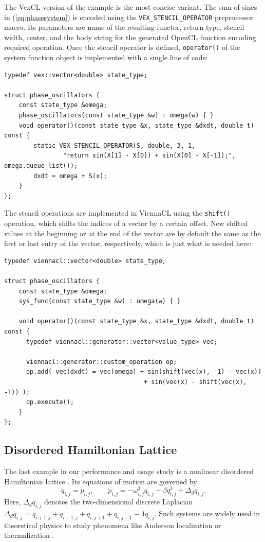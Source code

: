 \documentclass[final]{siamltex}
\newcommand{\code}[1]{\lstinline$#1$}
\newcommand{\eqref}[1]{(\ref{#1})}
\begin{document}
The VexCL version of the example is the most concise variant. The sum of
sines in \eqref{eq:phasesystem} is encoded using the
\code{VEX_STENCIL_OPERATOR} preprocessor macro. Its parameters are name of the
resulting functor, return type, stencil width, center, and the body string for
the generated OpenCL function encoding required operation.  Once the stencil
operator is defined, \code{operator()} of the system function object is
implemented with a single line of code:
\begin{lstlisting}
typedef vex::vector<double> state_type;

struct phase_oscillators {
    const state_type &omega;
    phase_oscillators(const state_type &w) : omega(w) { }
    void operator()(const state_type &x, state_type &dxdt, double t) const {
        static VEX_STENCIL_OPERATOR(S, double, 3, 1,
                "return sin(X[1] - X[0]) + sin(X[0] - X[-1]);", omega.queue_list());
        dxdt = omega + S(x);
    }
};
\end{lstlisting}


The stencil operations are implemented in ViennaCL using the \code{shift()} operation,
which shifts the indices of a vector by a certain offset. 
New shifted values at the beginning or at the end of the vector are by default the same as the first or last entry of the vector, respectively,
which is just what is needed here:
\begin{lstlisting}
typedef viennacl::vector<double> state_type;

struct phase_oscillators {
    const state_type &omega;
    sys_func(const state_type &w) : omega(w) { }

    void operator()(const state_type &x, state_type &dxdt, double t) const {
      typedef viennacl::generator::vector<value_type> vec;

      viennacl::generator::custom_operation op;
      op.add( vec(dxdt) = vec(omega) + sin(shift(vec(x),  1) - vec(x))
                                      + sin(vec(x) - shift(vec(x), -1)) );
      op.execute();
    }
};
\end{lstlisting}


%
%
\subsection{Disordered Hamiltonian Lattice}


The last example in our performance and usage study is a
nonlinear disordered Hamiltonian lattice \cite{mulansky_scaling_2012}. Its
equations of motion are governed by
\begin{equation}
\dot{q}_{i,j} = p_{i,j}, \quad \quad
\dot{p}_{i,j} = - \omega_{i,j}^2 q_{i,j} - \beta q_{i,j}^3 + \Delta_d q_{i,j}.
\label{eq:disordered_ham}
\end{equation}
Here, $\Delta_d q_{i,j}$ denotes the two-dimensional discrete Laplacian
$\Delta_d
q_{i,j}=q_{i+1,j}+q_{i-1,j}+q_{i,j+1}+q_{i,j-1}-4q_{i,j}$. Such
systems are widely used in theoretical physics to study phenomena
like Anderson localization \cite{Sheng-06} or thermalization \cite{FPUScholarpedia}.
\end{document}
